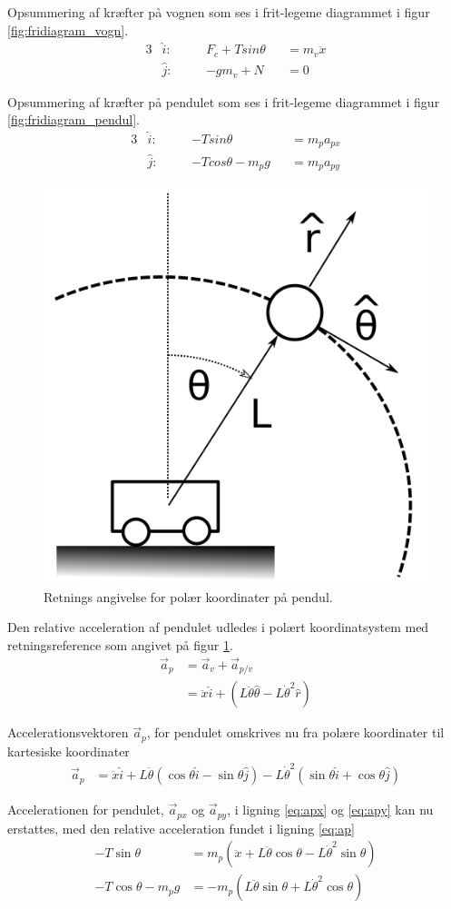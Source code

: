 Opsummering af kræfter på vognen som ses i frit-legeme diagrammet i figur \ref{fig:fridiagram_vogn}. 
\begin{alignat}{3}
&\hat{i} : \quad && F_c + T sin{\theta} && = m_v \ddot{x} \label{eq:vogn_x}\\
&\hat{j} : \quad && -g m_v + N && = 0 
\end{alignat}

Opsummering af kræfter på pendulet som ses i frit-legeme diagrammet i figur \ref{fig:fridiagram_pendul}.
\begin{alignat}{3}
&\hat{i} : \quad &&-T sin{\theta} &&= m_p a_{px}\label{eq:apx}\\
&\hat{j} : \quad &&-T cos{\theta} - m_p g &&= m_p a_{py}\label{eq:apy} 
\end{alignat}

\begin{figure}
	\centering
	\includegraphics[width=.3\textwidth]{billeder/pendul_vogn_polaer.png}
	\caption{Retnings angivelse for polær koordinater på pendul.}
	\label{fig:pendul_vogn_polaer}
\end{figure}

Den relative acceleration af pendulet udledes i polært koordinatsystem med retningsreference som angivet på figur \ref{fig:pendul_vogn_polaer}. 
\begin{align}
\vec{a}_p &= \vec{a}_v + \vec{a}_{p/v} \\
&= \ddot{x} \hat{i} + \left( L\ddot{\theta}\hat{\theta} - L\dot{\theta}^2\hat{r} \right)
\end{align}

Accelerationsvektoren $\vec{a}_p$, for pendulet omskrives nu fra polære koordinater til kartesiske koordinater  
\begin{align}
\vec{a}_p &=  \ddot{x} \hat{i} 
				+ L\ddot{\theta} \left( \cos{\theta}\hat{i} - \sin{\theta}\hat{j} \right) 
				- L\dot{\theta}^2 \left( \sin{\theta}\hat{i} + \cos{\theta}\hat{j} \right) \label{eq:ap}
\end{align} 

Accelerationen for pendulet, $\vec{a}_{px}$ og $\vec{a}_{py}$, i ligning \ref{eq:apx} og \ref{eq:apy} kan nu erstattes, med den relative acceleration fundet i ligning \ref{eq:ap}
\begin{align}
-T\sin{\theta} &= m_p \left( \ddot{x} + L\ddot{\theta}\cos{\theta} - L\dot{\theta}^2\sin{\theta} \right)  \label{eq:pendul_x2}\\
-T\cos{\theta} - m_p g &=  -m_p \left( L\ddot{\theta}\sin{\theta} + L\dot{\theta}^2\cos{\theta}  \right) \label{eq:pendul_y2}
\end{align} 

